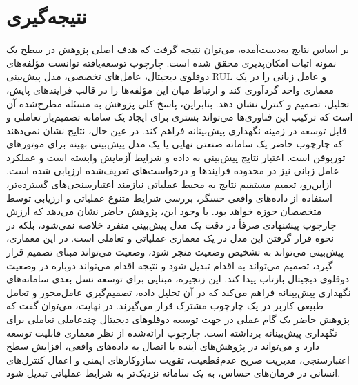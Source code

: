 \documentclass[a4paper,fleqn]{report}
\begin{document}
\section{نتیجه‌گیری}
\label{sec}
بر اساس نتایج به‌دست‌آمده، می‌توان نتیجه گرفت که هدف اصلی پژوهش در سطح یک نمونه اثبات امکان‌پذیری محقق شده است. چارچوب توسعه‌یافته توانست مؤلفه‌های دوقلوی دیجیتال، عامل‌های تخصصی، مدل پیش‌بینی \gls{RUL} و عامل زبانی را در یک معماری واحد گردآوری کند و ارتباط میان این مؤلفه‌ها را در قالب فرایندهای پایش، تحلیل، تصمیم و کنترل نشان دهد. بنابراین، پاسخ کلی پژوهش به مسئله مطرح‌شده آن است که ترکیب این فناوری‌ها می‌تواند بستری برای ایجاد یک سامانه تصمیم‌یار تعاملی و قابل توسعه در زمینه نگهداری پیش‌بینانه فراهم کند.
در عین حال، نتایج نشان نمی‌دهند که چارچوب حاضر یک سامانه صنعتی نهایی یا یک مدل پیش‌بینی بهینه برای موتورهای توربوفن است. اعتبار نتایج پیش‌بینی به داده و شرایط آزمایش وابسته است و عملکرد عامل زبانی نیز در محدوده فرایندها و درخواست‌های تعریف‌شده ارزیابی شده است. ازاین‌رو، تعمیم مستقیم نتایج به محیط عملیاتی نیازمند اعتبارسنجی‌های گسترده‌تر، استفاده از داده‌های واقعی حسگر، بررسی شرایط متنوع عملیاتی و ارزیابی توسط متخصصان حوزه خواهد بود.
با وجود این، پژوهش حاضر نشان می‌دهد که ارزش چارچوب پیشنهادی صرفاً در دقت یک مدل پیش‌بینی منفرد خلاصه نمی‌شود، بلکه در نحوه قرار گرفتن این مدل در یک معماری عملیاتی و تعاملی است. در این معماری، پیش‌بینی می‌تواند به تشخیص وضعیت منجر شود، وضعیت می‌تواند مبنای تصمیم قرار گیرد، تصمیم می‌تواند به اقدام تبدیل شود و نتیجه اقدام می‌تواند دوباره در وضعیت دوقلوی دیجیتال بازتاب پیدا کند. این زنجیره، مبنایی برای توسعه نسل بعدی سامانه‌های نگهداری پیش‌بینانه فراهم می‌کند که در آن تحلیل داده، تصمیم‌گیری عامل‌محور و تعامل طبیعی کاربر در یک چارچوب مشترک قرار می‌گیرند.
در نهایت، می‌توان گفت که پژوهش حاضر یک گام عملی در جهت توسعه دوقلوهای دیجیتال چندعاملی تعاملی برای نگهداری پیش‌بینانه برداشته است. چارچوب ارائه‌شده از نظر معماری قابلیت توسعه دارد و می‌تواند در پژوهش‌های آینده با اتصال به داده‌های واقعی، افزایش سطح اعتبارسنجی، مدیریت صریح عدم‌قطعیت، تقویت سازوکارهای ایمنی و اعمال کنترل‌های انسانی در فرمان‌های حساس، به یک سامانه نزدیک‌تر به شرایط عملیاتی تبدیل شود.
\end{document}
